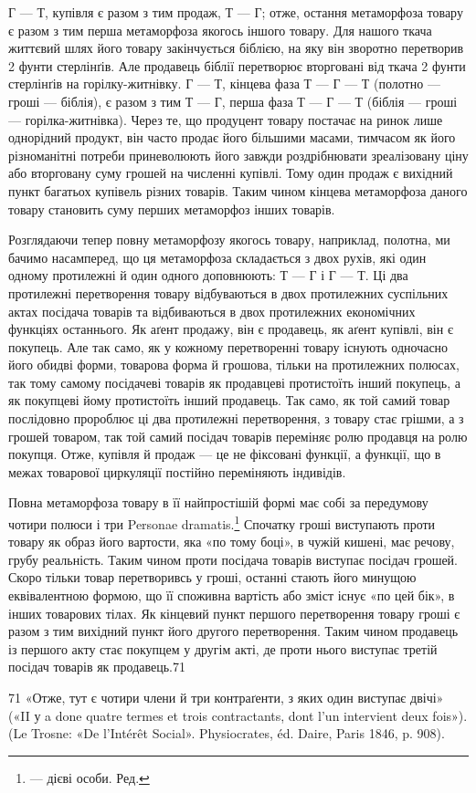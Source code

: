 Г — Т, купівля є разом з тим продаж, Т — Г; отже, остання
метаморфоза товару є разом з тим перша метаморфоза якогось
іншого товару. Для нашого ткача життєвий шлях його товару
закінчується біблією, на яку він зворотно перетворив 2 фунти
стерлінґів. Але продавець біблії перетворює вторговані від ткача
2 фунти стерлінґів на горілку-житнівку. Г — Т, кінцева фаза
Т — Г — Т (полотно — гроші — біблія), є разом з тим Т — Г,
перша фаза Т — Г — Т (біблія — гроші — горілка-житнівка).
Через те, що продуцент товару постачає на ринок лише однорідний
продукт, він часто продає його більшими масами, тимчасом
як його різноманітні потреби приневолюють його завжди
роздрібнювати зреалізовану ціну або вторговану суму грошей
на численні купівлі. Тому один продаж є вихідний пункт багатьох
купівель різних товарів. Таким чином кінцева метаморфоза
даного товару становить суму перших метаморфоз інших товарів.

Розглядаючи тепер повну метаморфозу якогось товару, наприклад,
полотна, ми бачимо насамперед, що ця метаморфоза
складається з двох рухів, які один одному протилежні й один
одного доповнюють: Т — Г і Г — Т. Ці два протилежні перетворення
товару відбуваються в двох протилежних суспільних
актах посідача товарів та відбиваються в двох протилежних
економічних функціях останнього. Як аґент продажу, він є продавець,
як аґент купівлі, він є покупець. Але так само, як у
кожному перетворенні товару існують одночасно його обидві
форми, товарова форма й грошова, тільки на протилежних полюсах,
так тому самому посідачеві товарів як продавцеві протистоїть
інший покупець, а як покупцеві йому протистоїть інший продавець.
Так само, як той самий товар послідовно пророблює ці два протилежні
перетворення, з товару стає грішми, а з грошей товаром, так
той самий посідач товарів переміняє ролю продавця на ролю покупця.
Отже, купівля й продаж — це не фіксовані функції, а функції,
що в межах товарової циркуляції постійно переміняють індивідів.

Повна метаморфоза товару в її найпростішій формі має собі
за передумову чотири полюси і три Personae dramatis.\footnote*{
— дієві особи. Ред.
} Спочатку
гроші виступають проти товару як образ його вартости, яка
«по тому боці», в чужій кишені, має речову, грубу реальність.
Таким чином проти посідача товарів виступає посідач грошей.
Скоро тільки товар перетворивсь у гроші, останні стають його
минущою еквівалентною формою, що її споживна вартість або
зміст існує «по цей бік», в інших товарових тілах. Як кінцевий
пункт першого перетворення товару гроші є разом з тим вихідний
пункт його другого перетворення. Таким чином продавець
із першого акту стає покупцем у другім акті, де проти нього
виступає третій посідач товарів як продавець.71

71 «Отже, тут є чотири члени й три контраґенти, з яких один виступає
двічі» («II у a done quatre termes et trois contractants, dont l’un intervient
deux fois»). (Le Trosne: «De l’Intérêt Social». Physiocrates, éd. Daire,
Paris 1846, p. 908).